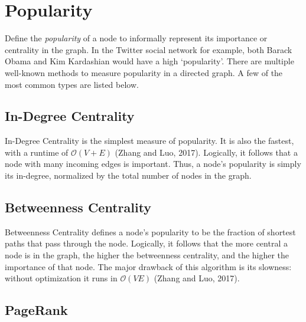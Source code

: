 \documentclass{article}
\begin{document}
\section{Popularity}

Define the \emph{popularity} of a node to informally represent its
importance or centrality in the graph. In the Twitter social network for
example, both Barack Obama and Kim Kardashian would have a high
`popularity'. There are multiple well-known methods to measure
popularity in a directed graph. A few of the most common types are
listed below.

\subsection{In-Degree Centrality}

In-Degree Centrality is the simplest measure of popularity. It is also
the fastest, with a runtime of \(\mathcal{O}(V + E)\) (Zhang and Luo,
2017). Logically, it follows that a node with many incoming edges is
important. Thus, a node's popularity is simply its in-degree, normalized
by the total number of nodes in the graph.

\subsection{Betweenness Centrality}

Betweenness Centrality defines a node's popularity to be the fraction of
shortest paths that pass through the node. Logically, it follows that
the more central a node is in the graph, the higher the betweenness
centrality, and the higher the importance of that node. The major
drawback of this algorithm is its slowness: without optimization it runs
in \(\mathcal{O}\left(VE\right)\) (Zhang and Luo, 2017).

\subsection{PageRank}
\end{document}
